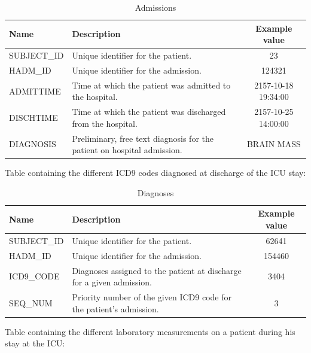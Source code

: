 \begin{table}[H]
 \begin{center}
  \caption{Admissions}
  \begin{tabular}{| l | p{7cm} | c | }
   \hline
   \textbf{Name} & \textbf{Description} & \textbf{Example value} \\ \hline
   SUBJECT\_ID &  Unique identifier for the patient. & 23 \\ \hline
   HADM\_ID & Unique identifier for the admission. & 124321 \\ \hline
   ADMITTIME & Time at which the patient was admitted to the hospital. & 2157-10-18 19:34:00 \\ \hline
   DISCHTIME & Time at which the patient was discharged from the hospital. & 2157-10-25 14:00:00 \\ \hline
   DIAGNOSIS & Preliminary, free text diagnosis for the patient on hospital admission. & BRAIN MASS \\
   \hline
  \end{tabular}
 \end{center}
\end{table}

Table containing the different ICD9 codes diagnosed at discharge of the ICU stay:

\begin{table}[H]
 \begin{center}
  \caption{Diagnoses}
  \begin{tabular}{| l | p{7cm} | c | }
   \hline
   \textbf{Name} & \textbf{Description} & \textbf{Example value} \\ \hline
   SUBJECT\_ID &  Unique identifier for the patient. & 62641 \\ \hline
   HADM\_ID & Unique identifier for the admission. & 154460 \\ \hline
   ICD9\_CODE & Diagnoses assigned to the patient at discharge for a given admission. & 3404 \\ \hline
   SEQ\_NUM & Priority number of the given ICD9 code for the patient's admission. & 3 \\
   \hline
  \end{tabular}
 \end{center}
\end{table}

\newpage
Table containing the different laboratory measurements on a patient during his stay at the ICU:

